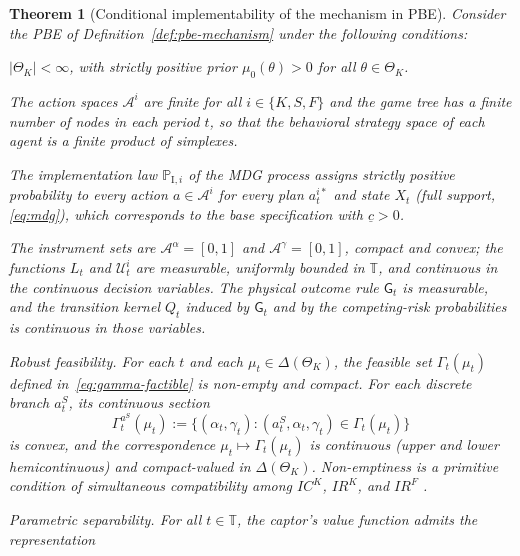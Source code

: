 \documentclass[review,authoryear,12pt]{elsarticle}
\theoremstyle{plain}
\newtheorem{theorem}{Theorem}
\theoremstyle{definition}
\newcommand{\ThetaK}{\Theta_K}
\newcommand{\1}{\mathbf{1}}
\newcommand{\ProbI}[1]{\mathbb{P}_{\mathrm{I},#1}}
\begin{document}
\begin{theorem}[Conditional implementability of the mechanism in PBE]\label{thm:ebp-implementabilidad}
\normalfont
Consider the PBE of Definition~\ref{def:pbe-mechanism} under the following conditions:
\begin{list}{}{\setlength{\labelwidth}{2.6em}\setlength{\labelsep}{0.7em}\setlength{\leftmargin}{3.3em}\setlength{\itemindent}{0pt}\setlength{\listparindent}{0pt}\setlength{\parsep}{0pt}\setlength{\itemsep}{0.35\baselineskip}}
  \item[\textup{(i)}] $|\ThetaK|<\infty$, with strictly positive prior $\mu_0(\theta)>0$ for all $\theta\in\ThetaK$.
  \item[\textup{(ii)}] The action spaces $\mathcal{A}^i$ are finite for all $i\in\{K,S,F\}$ and the game tree has a finite number of nodes in each period $t$, so that the behavioral strategy space of each agent is a finite product of simplexes.
  \item[\textup{(iii)}] The implementation law $\ProbI{i}$ of the MDG process assigns strictly positive probability to every action $a\in\mathcal{A}^i$ for every plan $a_t^{i\ast}$ and state $X_t$ \textup{(}full support, \eqref{eq:mdg}\textup{)}, which corresponds to the base specification with $\underline{c}>0$.
  \item[\textup{(iv)}] The instrument sets are $\mathcal{A}^{\alpha}=[0,1]$ and $\mathcal{A}^{\gamma}=[0,1]$, compact and convex; the functions $L_t$ and $\mathcal{U}_t^i$ are measurable, uniformly bounded in $\mathbb{T}$, and continuous in the continuous decision variables. The physical outcome rule $\mathsf{G}_t$ is measurable, and the transition kernel $Q_t$ induced by $\mathsf{G}_t$ and by the competing-risk probabilities is continuous in those variables.
  \item[\textup{(v)}] Robust feasibility. For each $t$ and each $\mu_t\in\Delta(\ThetaK)$, the feasible set $\Gamma_t(\mu_t)$ defined in~\eqref{eq:gamma-factible} is non-empty and compact. For each discrete branch $a_t^S$, its continuous section
  \[
  \Gamma_t^{a^S}(\mu_t):=\{(\alpha_t,\gamma_t):(a_t^S,\alpha_t,\gamma_t)\in\Gamma_t(\mu_t)\}
  \]
  is convex, and the correspondence $\mu_t\mapsto\Gamma_t(\mu_t)$ is continuous \textup{(}upper and lower hemicontinuous\textup{)} and compact-valued in $\Delta(\ThetaK)$. Non-emptiness is a primitive condition of simultaneous compatibility among $IC^K$, $IR^K$, and $IR^F$ \citep{KadanRenySwinkels2017}.
  \item[\textup{(vi)}] Parametric separability. For all $t\in\mathbb{T}$, the captor's value function admits the representation

\end{list}
\end{theorem}
\end{document}
